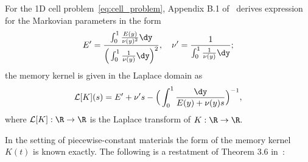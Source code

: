\documentclass[letterpaper,11pt]{article}
\begin{document}
For the 1D cell problem~\eqref{eq:cell_problem}, Appendix B.1 of~\cite{bhattacharya2023learning} derives expression for the Markovian parameters in the form
\begin{equation}\label{eq:markov_params}
    E' = \frac{\int_0^1\frac{E(y)}{\nu(y)^2}\dy}{\Big(\int_0^1\frac{1}{\nu(y)}\dy\Big)^2}, \quad \nu' = \frac{1}{\int_0^1\frac{1}{\nu(y)}\dy};
\end{equation}
the memory kernel is given in the Laplace domain as
\begin{equation}
    \mathcal{L}[K](s) = E' + \nu's - \Big(\int_0^1\frac{\dy}{E(y)+\nu(y)s}\Big)^{-1},
\end{equation}
where $\mathcal{L}[K]: \R \to \R$ is the Laplace transform of $K: \R \to \R.$

In the setting of piecewise-constant materials the form of the memory kernel $K(t)$ is known exactly. The following is a restatment of Theorem 3.6 in~\cite{bhattacharya2023learning}:
\end{document}
